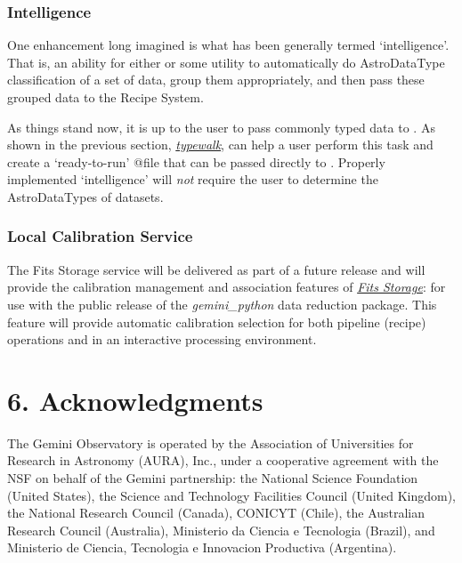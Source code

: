 \documentclass[letterpaper,10pt,english]{sphinxmanual}
\begin{document}
\subsection{Intelligence}
\label{discuss:intelligence}
One enhancement long imagined is what has been generally termed `intelligence'.
That is, an ability for either  or some utility to automatically do
AstroDataType classification of a set of data, group them appropriately, and
then pass these grouped data to the Recipe System.

As things stand now, it is up to the user to pass commonly typed data to
. As shown in the previous section, {\hyperref[supptools:typewalk]{\emph{typewalk}}}, 
can help a user perform this task and create a `ready-to-run' @file that can
be passed directly to . Properly implemented `intelligence' will
\emph{not} require the user to determine the AstroDataTypes of datasets.


\subsection{Local Calibration Service}
\label{discuss:local-calibration-service}
The Fits Storage service will be delivered as part of a future release and will
provide the calibration management and association features of {\hyperref[discuss:fitsstore]{\emph{Fits Storage}}}: for
use with the public release of the \emph{gemini\_python} data reduction package. This
feature will provide automatic calibration selection for both pipeline (recipe)
operations and in an interactive processing environment.


\chapter{6. Acknowledgments}
\label{ack::doc}\label{ack:acknowledgments}
The Gemini Observatory is operated by the Association of Universities for
Research in Astronomy (AURA), Inc., under a cooperative agreement with the NSF on
behalf of the Gemini partnership: the National Science Foundation
(United States), the Science and Technology Facilities Council (United Kingdom),
the National Research Council (Canada), CONICYT (Chile), the Australian
Research Council (Australia), Ministerio da Ciencia e Tecnologia (Brazil),
and Ministerio de Ciencia, Tecnologia e Innovacion Productiva (Argentina).
\appendix
\noappendicestocpagenum
\addappheadtotoc
\end{document}
